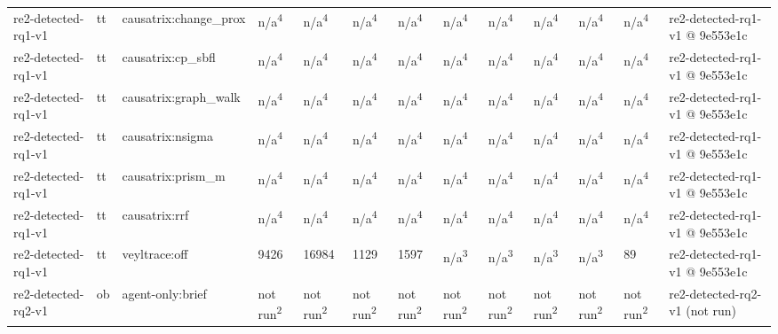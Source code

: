 \begin{table}[t]
\begin{tabular}{lllllllllllll}
re2-detected-rq1-v1 & tt & causatrix:change\_prox & n/a\textsuperscript{4} & n/a\textsuperscript{4} & n/a\textsuperscript{4} & n/a\textsuperscript{4} & n/a\textsuperscript{4} & n/a\textsuperscript{4} & n/a\textsuperscript{4} & n/a\textsuperscript{4} & n/a\textsuperscript{4} & re2-detected-rq1-v1 @ 9e553e1c \\
re2-detected-rq1-v1 & tt & causatrix:cp\_sbfl & n/a\textsuperscript{4} & n/a\textsuperscript{4} & n/a\textsuperscript{4} & n/a\textsuperscript{4} & n/a\textsuperscript{4} & n/a\textsuperscript{4} & n/a\textsuperscript{4} & n/a\textsuperscript{4} & n/a\textsuperscript{4} & re2-detected-rq1-v1 @ 9e553e1c \\
re2-detected-rq1-v1 & tt & causatrix:graph\_walk & n/a\textsuperscript{4} & n/a\textsuperscript{4} & n/a\textsuperscript{4} & n/a\textsuperscript{4} & n/a\textsuperscript{4} & n/a\textsuperscript{4} & n/a\textsuperscript{4} & n/a\textsuperscript{4} & n/a\textsuperscript{4} & re2-detected-rq1-v1 @ 9e553e1c \\
re2-detected-rq1-v1 & tt & causatrix:nsigma & n/a\textsuperscript{4} & n/a\textsuperscript{4} & n/a\textsuperscript{4} & n/a\textsuperscript{4} & n/a\textsuperscript{4} & n/a\textsuperscript{4} & n/a\textsuperscript{4} & n/a\textsuperscript{4} & n/a\textsuperscript{4} & re2-detected-rq1-v1 @ 9e553e1c \\
re2-detected-rq1-v1 & tt & causatrix:prism\_m & n/a\textsuperscript{4} & n/a\textsuperscript{4} & n/a\textsuperscript{4} & n/a\textsuperscript{4} & n/a\textsuperscript{4} & n/a\textsuperscript{4} & n/a\textsuperscript{4} & n/a\textsuperscript{4} & n/a\textsuperscript{4} & re2-detected-rq1-v1 @ 9e553e1c \\
re2-detected-rq1-v1 & tt & causatrix:rrf & n/a\textsuperscript{4} & n/a\textsuperscript{4} & n/a\textsuperscript{4} & n/a\textsuperscript{4} & n/a\textsuperscript{4} & n/a\textsuperscript{4} & n/a\textsuperscript{4} & n/a\textsuperscript{4} & n/a\textsuperscript{4} & re2-detected-rq1-v1 @ 9e553e1c \\
re2-detected-rq1-v1 & tt & veyltrace:off & 9426 & 16984 & 1129 & 1597 & n/a\textsuperscript{3} & n/a\textsuperscript{3} & n/a\textsuperscript{3} & n/a\textsuperscript{3} & 89 & re2-detected-rq1-v1 @ 9e553e1c \\
re2-detected-rq2-v1 & ob & agent-only:brief & not run\textsuperscript{2} & not run\textsuperscript{2} & not run\textsuperscript{2} & not run\textsuperscript{2} & not run\textsuperscript{2} & not run\textsuperscript{2} & not run\textsuperscript{2} & not run\textsuperscript{2} & not run\textsuperscript{2} & re2-detected-rq2-v1 (not run) \\

\end{tabular}
\end{table}
